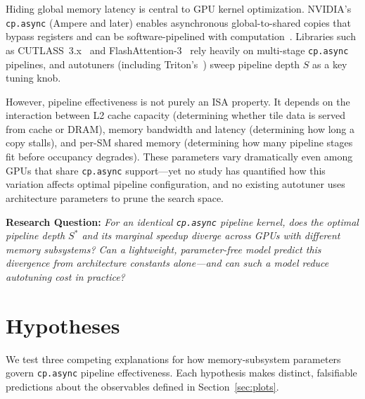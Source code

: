 \documentclass[sigplan,nonacm,10pt]{acmart}
\begin{document}
Hiding global memory latency is central to GPU kernel optimization.
NVIDIA's \texttt{cp.async} (Ampere and later) enables asynchronous
global-to-shared copies that bypass registers and can be
software-pipelined with computation~\cite{cuda_guide}.
Libraries such as CUTLASS~3.x~\cite{cutlass3} and
FlashAttention-3~\cite{flashattn3} rely heavily on multi-stage
\texttt{cp.async} pipelines, and autotuners (including
Triton's~\cite{triton}) sweep pipeline depth $S$ as a key tuning knob.

However, pipeline effectiveness is not purely an ISA property.
It depends on the interaction between L2 cache capacity (determining
whether tile data is served from cache or DRAM), memory bandwidth and
latency (determining how long a copy stalls), and per-SM shared memory
(determining how many pipeline stages fit before occupancy degrades).
These parameters vary dramatically even among GPUs that share
\texttt{cp.async} support---yet no study has quantified how this
variation affects optimal pipeline configuration, and no existing
autotuner uses architecture parameters to prune the search space.

\smallskip
\noindent\textbf{Research Question:}
\emph{For an identical \texttt{cp.async} pipeline kernel, does the optimal
pipeline depth $S^*$ and its marginal speedup diverge across GPUs with
different memory subsystems?  Can a lightweight, parameter-free model
predict this divergence from architecture constants alone---and can such
a model reduce autotuning cost in practice?}

\section{Hypotheses}
\label{sec:hypotheses}

We test three competing explanations for how memory-subsystem parameters
govern \texttt{cp.async} pipeline effectiveness.  Each hypothesis makes
distinct, falsifiable predictions about the observables defined in
Section~\ref{sec:plots}.
\end{document}

